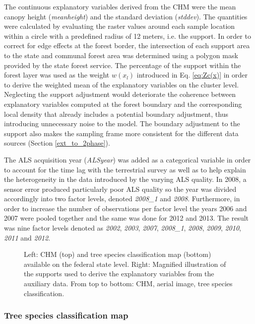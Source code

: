 \documentclass[remotesensing,article,submit,moreauthors,pdftex,10pt,a4paper]{mdpi}
\begin{document}
The continuous explanatory variables derived from the CHM were the mean canopy height (\textit{meanheight}) and the standard deviation (\textit{stddev}). The quantities were calculated by evaluating the raster values around each sample location within a circle with a predefined radius of 12 meters, i.e. the support. In order to correct for edge effects at the forest border, the intersection of each support area to the state and communal forest area was determined using a polygon mask provided by the state forest service. The percentage of the support within the forest layer was used as the weight $w(x_l)$ introduced in Eq. \ref{eq:Zc(x)} in order to derive the weighted mean of the explanatory variables on the cluster level. Neglecting the support adjustment would deteriorate the coherence between explanatory variables computed at the forest boundary and the corresponding local density that already includes a potential boundary adjustment, thus introducing unnecessary noise to the model. The boundary adjustment to the support also makes the sampling frame more consistent for the different data sources (Section \ref{ext_to_2phase}).\par
The ALS acquisition year (\textit{ALSyear}) was added as a categorical variable in order to account for the time lag with the terrestrial survey as well as to help explain the heterogeneity in the data introduced by the varying ALS quality. In 2008, a sensor error produced particularly poor ALS quality so the year was divided accordingly into two factor levels, denoted \textit{2008\_1} and \textit{2008}. Furthermore, in order to increase the number of observations per factor level the years 2006 and 2007 were pooled together and the same was done for 2012 and 2013.  The result was nine factor levels denoted as \textit{2002}, \textit{2003}, \textit{2007}, \textit{2008\_1}, \textit{2008}, \textit{2009}, \textit{2010}, \textit{2011} and \textit{2012}.

\begin{figure}[H]
	\centering
	\caption{Left: CHM (top) and tree species classification map (bottom) available on the federal state level. Right: Magnified illustration of the supports used to derive the explanatory variables from the auxiliary data. From top to bottom: CHM, aerial image, tree species classification.}
	\label{fig:Auxvars}
\end{figure}


\subsubsection{Tree species classification map}
\end{document}
